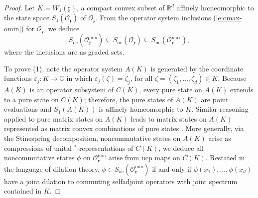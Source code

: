 \documentclass{amsart}
\theoremstyle{definition}
\theoremstyle{remark}
\numberwithin{equation}{section}
\begin{document}
\begin{proof} Let $K=W_1(\mathfrak x)$, a compact convex subset of $\mathbb R^d$ affinely homeomorphic to the state
space $S_1(\mathcal O_{\mathfrak x})$ of $\mathcal O_{\mathfrak x}$.
From the operator system inclusions (\ref{e:omax-omin}) for $\mathcal O_{\mathfrak x}$, we deduce
\begin{equation}\label{e:max-min}
S_{\textrm{nc}}(\mathcal O_{\mathfrak x}^{\textrm{min}}) \subseteq S_{\textrm{nc}}(\mathcal O_{\mathfrak x}) \subseteq S_{\textrm{nc}}(\mathcal O_{\mathfrak x}^{\max}),
\end{equation}
where the inclusions are as graded sets. 

To prove (1), note
the operator system $A(K)$ is generated by the coordinate functions
$\varepsilon_j:K\rightarrow\mathbb C$ in which $\varepsilon_j(\zeta)=\zeta_j$, for all $\zeta=(\zeta_1,\dots,\zeta_d)\in K$. 
Because $A(K)$ is an operator subsystem of $C(K)$, every pure state on
$A(K)$ extends to a pure state on $C(K)$; therefore, the pure states of $A(K)$ are point evaluations and $S_1(A(K))$ is affinely homeomorphic to $K$.
Similar reasoning applied to pure matrix states on $A(K)$ leads to matrix states on $A(K)$ represented as matrix convex combinations of pure states
\cite{farenick2000}. More generally, via the Stinespring
decomposition, noncommutative states on $A(K)$ arise as compressions of unital $^*$-representations of $C(K)$, we deduce all noncommutative
states $\phi$ on $\mathcal O_{\mathfrak x}^{\textrm{min}}$ arise from ucp maps on $C(K)$. Restated in the language of dilation theory,
$\phi\in S_{\textrm{nc}}(\mathcal O_{\mathfrak x}^{\textrm{min}})$ if and only if $\phi(x_1),\dots,\phi(x_d)$ have a joint dilation to commuting selfadjoint operators with
joint spectrum contained in $K$.


\end{proof}
\end{document}
